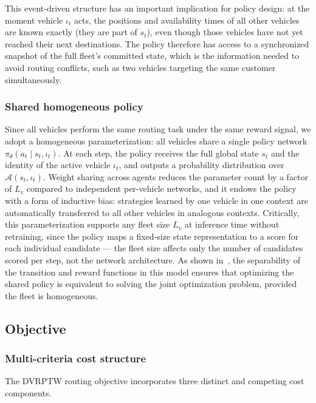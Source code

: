 \documentclass[conference]{IEEEtran}
\begin{document}
This event-driven structure has an important implication for policy design: at the moment vehicle $\iota_t$ acts, the positions and availability times of all other vehicles are known exactly (they are part of $s_t$), even though those vehicles have not yet reached their next destinations.
The policy therefore has access to a synchronized snapshot of the full fleet's committed state, which is the information needed to avoid routing conflicts, such as two vehicles targeting the same customer simultaneously.

\subsubsection{Shared homogeneous policy}
Since all vehicles perform the same routing task under the same reward signal, we adopt a homogeneous parameterization: all vehicles share a single policy network $\pi_\theta(a_t \mid s_t, \iota_t)$.
At each step, the policy receives the full global state $s_t$ and the identity of the active vehicle $\iota_t$, and outputs a probability distribution over $\mathcal{A}(s_t, \iota_t)$.
Weight sharing across agents reduces the parameter count by a factor of $L_v$ compared to independent per-vehicle networks, and it endows the policy with a form of inductive bias: strategies learned by one vehicle in one context are automatically transferred to all other vehicles in analogous contexts.
Critically, this parameterization supports any fleet size $L_v$ at inference time without retraining, since the policy maps a fixed-size state representation to a score for each individual candidate --- the fleet size affects only the number of candidates scored per step, not the network architecture.
As shown in~\cite{TAM2026114234}, the separability of the transition and reward functions in this model ensures that optimizing the shared policy is equivalent to solving the joint optimization problem, provided the fleet is homogeneous.

\subsection{Objective}
\label{sec:prob_obj}

\subsubsection{Multi-criteria cost structure}
The DVRPTW routing objective incorporates three distinct and competing cost components.
\end{document}
